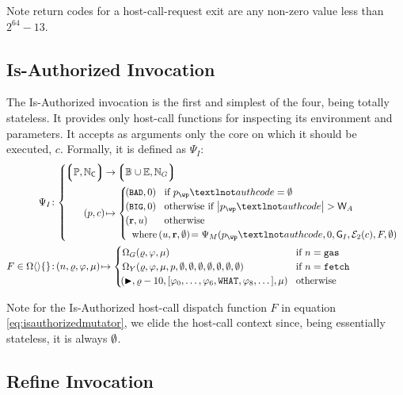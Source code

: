 Note return codes for a host-call-request exit are any non-zero value less than $2^{64} - 13$.

\subsection{Is-Authorized Invocation}\label{sec:isauthorizedinvocation}

The Is-Authorized invocation is the first and simplest of the four, being totally stateless. It provides only host-call functions for inspecting its environment and parameters. It accepts as arguments only the core on which it should be executed, $c$. Formally, it is defined as $\Psi_I$:
\begin{align}
  \Psi_I &\colon \abracegroup{
    \tuple{\workpackage, \coreindex} &\to \tuple{\blob \cup \workerror, \gas} \\
    \tup{\wpX, c} &\mapsto \begin{cases}
      \tup{\token{BAD}, 0} &\when \wpX_\wp¬authcode = \none \\
      \tup{\token{BIG}, 0} &\otherwhen \len{\wpX_\wp¬authcode} > \mathsf{W}_A \\
      \tup{\mathbf{r}, u} &\otherwise \\
      \multicolumn{2}{l}{\where \tup{u, \mathbf{r}, \none} = \Psi_M(\wpX_\wp¬authcode, 0, \mathsf{G}_I, \encode[2]{c}, F, \none)}\\
    \end{cases}\\
  } \\
  \label{eq:isauthorizedmutator}F \in \contextmutator{\emset} &\colon
    \tup{n, \gascounter, \registers, \memory} \mapsto \begin{cases}
      \Omega_G(\gascounter, \registers, \memory) &\when n = \mathtt{gas} \\
      \Omega_Y(\gascounter, \registers, \memory, \wpX, \none, \none, \none, \none, \none, \none, \none) &\when n = \mathtt{fetch} \\
      \tup{\continue, \gascounter - 10, \sq{\registers_0, \dots, \registers_6, \mathtt{WHAT}, \registers_8, \dots}, \memory} &\otherwise
    \end{cases}
\end{align}

Note for the Is-Authorized host-call dispatch function $F$ in equation \ref{eq:isauthorizedmutator}, we elide the host-call context since, being essentially stateless, it is always $\emptyset$.

\subsection{Refine Invocation}\label{sec:refineinvocation}

